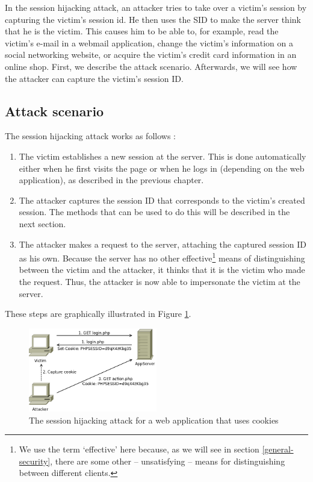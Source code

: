 In the session hijacking attack, an attacker tries to take over a victim's session by capturing the victim's \gls{session id}. He then uses the SID to make the server think that he is the victim. This causes him to be able to, for example, read the victim's e-mail in a webmail application, change the victim's information on a social networking website, or acquire the victim's credit card information in an online shop. First, we describe the attack scenario. Afterwards, we will see how the attacker can capture the victim's session ID.

\subsection{Attack scenario}

The session hijacking attack works as follows \cite{Nikiforakis2010}:

\begin{enumerate}
	\item The victim establishes a new session at the server. This is done automatically either when he first visits the page or when he logs in (depending on the web application), as described in the previous chapter.
	\item The attacker captures the session ID that corresponds to the victim's created session. The methods that can be used to do this will be described in the next section.
	\item The attacker makes a request to the server, attaching the captured session ID as his own. Because the server has no other effective\footnote{We use the term `effective' here because, as we will see in section \ref{general-security}, there are some other -- unsatisfying -- means for distinguishing between different clients.} means of distinguishing between the victim and the attacker, it thinks that it is the victim who made the request. Thus, the attacker is now able to impersonate the victim at the server.
\end{enumerate}

These steps are graphically illustrated in Figure \ref{fig:hijacking}.

\begin{figure}[htb]
	\centering
	\includegraphics[width=0.50\textwidth]{img/hijacking.png}
	\caption[The session hijacking attack]{The session hijacking attack for a web application that uses cookies}
	\label{fig:hijacking}
\end{figure}

